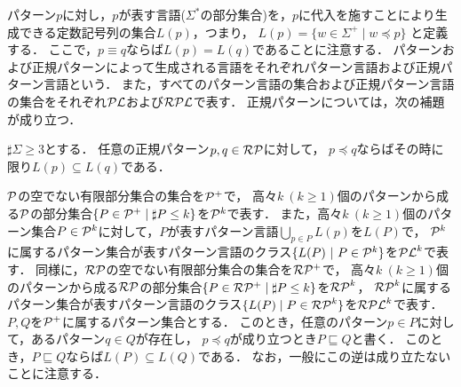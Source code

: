 パターン$p$に対し，$p$が表す言語($\Sigma^{*}$の部分集合)を，$p$に代入を施すことにより生成できる定数記号列の集合$L(p)$，つまり，
$L(p)=\{w\in \Sigma^{+} \mid w \preceq p\}$
と定義する．
ここで，$p \equiv q$ならば$L(p)=L(q)$であることに注意する．
パターンおよび正規パターンによって生成される言語をそれぞれパターン言語および正規パターン言語という．
また，すべてのパターン言語の集合および正規パターン言語の集合をそれぞれ$\mathcal{PL}$および$\mathcal{RPL}$で表す．
正規パターンについては，次の補題が成り立つ．
\begin{lem}\label{補題1}
  $\sharp \Sigma \geq 3$とする．
  任意の正規パターン$p,q \in \mathcal{RP}$に対して，
$p \preceq q$ならばその時に限り$L(p) \subseteq L(q)$である．
\end{lem}
$\mathcal P$の空でない有限部分集合の集合を$\mathcal{P^{+}}$で，
高々$k~(k\geq 1)$個のパターンから成る$\mathcal P$の部分集合$\{P\in \mathcal{P^{+}} \mid \sharp P \leq k\}$を$\mathcal P^{k}$で表す．
また，高々$k~(k\geq 1)$個のパターン集合$P\in \mathcal P^{k}$に対して，$P$が表すパターン言語$\bigcup_{p\in P}L(p)$を$L(P)$で，
$\mathcal P^{k}$に属するパターン集合が表すパターン言語のクラス$\{ L(P) \ | \ P \in \mathcal P^{k} \}$を$\mathcal{PL}^{k}$で表す．
同様に，$\mathcal{RP}$の空でない有限部分集合の集合を$\mathcal{RP^{+}}$で，
高々$k~(k\geq 1)$個のパターンから成る$\mathcal{RP}$の部分集合$\{P \in \mathcal{RP^{+}} \mid \sharp P \leq k\}$を$\mathcal{RP}^{k}$，
$\mathcal{RP}^{k}$に属するパターン集合が表すパターン言語のクラス$\{L(P) \mid P\in \mathcal{RP}^{k}\}$を$\mathcal{RPL}^{k}$で表す． 
$P, Q$を$\mathcal{P^{+}}$に属するパターン集合とする．
このとき，任意のパターン$p \in P$に対して，あるパターン$q\in Q$が存在し，
$p\preceq q$が成り立つとき$P \sqsubseteq Q$と書く．
%
このとき，$P \sqsubseteq Q$ならば$L(P) \subseteq L(Q)$である．
なお，一般にこの逆は成り立たないことに注意する．